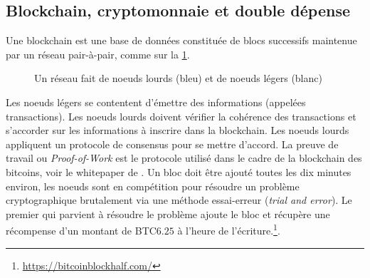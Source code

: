 \subsection{Blockchain, cryptomonnaie et double dépense}
Une blockchain est une base de données constituée de blocs successifs maintenue par un réseau pair-à-pair, comme sur la \cref{fig:blockchain_network}. 
\begin{figure}[ht!]
\begin{center}
\end{center}
\caption{Un réseau fait de noeuds lourds (bleu) et de noeuds légers (blanc)}
\label{fig:blockchain_network}
\end{figure}
Les noeuds légers se contentent d'émettre des informations (appelées transactions). Les noeuds lourds doivent vérifier la cohérence des transactions et s'accorder sur les informations à inscrire dans la blockchain. Les noeuds lourds appliquent un protocole de consensus pour se mettre d'accord. La preuve de travail ou \textit{Proof-of-Work} est le protocole utilisé dans le cadre de la blockchain des bitcoins, voir le whitepaper de \citet{Nakamoto2008}. Un bloc doit être ajouté toutes les dix minutes environ, les noeuds sont en compétition pour résoudre un problème cryptographique brutalement via une méthode essai-erreur (\textit{trial and error}). Le premier qui parvient à résoudre le problème ajoute le bloc et récupère une récompense d'un montant de BTC$6.25$ à l'heure de l'écriture.\footnote{\url{https://bitcoinblockhalf.com/}}. \\

